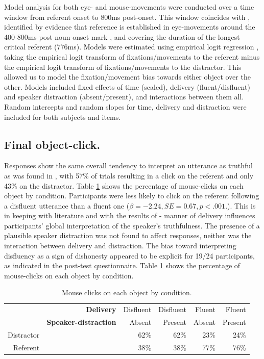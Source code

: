 \documentclass[a4paper,man,natbib]{apa6}
\begin{document}
Model analysis for both eye- and mouse-movements were conducted over a time window from referent onset to 800ms post-onset. 
This window coincides with \citet{Loy2016}, identified by evidence that reference is established in eye-movements around the 400-800ms post noun-onset mark \citep{Eberhard1995}, and covering the duration of the longest critical referent (776ms). 
Models were estimated using empirical logit regression \citep{Barr2008}, taking the empirical logit transform of fixations/movements to the referent minus the empirical logit transform of fixations/movements to the distractor.
This allowed us to model the fixation/movement bias towards either object over the other. 
Models included fixed effects of time (scaled), delivery (fluent/disfluent) and speaker distraction (absent/present), and interactions between them all. 
Random intercepts and random slopes for time, delivery and distraction were included for both subjects and items.


\subsection{Final object-click.}
Responses show the same overall tendency to interpret an utterance as truthful as was found in \citet{Loy2016}, with 57\% of trials resulting in a click on the referent and only 43\% on the distractor. 
Table \ref{table:objctclck} shows the percentage of mouse-clicks on each object by condition.
Participants were less likely to click on the referent following a disfluent utterance than a fluent one ($\beta = -2.24,SE = 0.67,p<.001.$). 
This is in keeping with literature \citep{Brennan1995, Swerts2005} and with the results of \citet{Loy2016} - manner of delivery influences participants' global interpretation of the speaker's truthfulness. 
The presence of a plausible speaker distraction was not found to affect responses, neither was the interaction between delivery and distraction. 
The bias toward interpreting disfluency as a sign of dishonesty appeared to be explicit for 19/24 participants, as indicated in the post-test questionnaire. 
Table \ref{table:objctclck} shows the percentage of mouse-clicks on each object by condition.


\begin{table}[ht]
\centering
\begin{tabular}{rrrrrr}
  \hline
& \textbf{Delivery} & Disfluent & Disfluent & Fluent & Fluent \\ 
& \textbf{Speaker-distraction} & Absent & Present & Absent & Present \\
  \hline
Distractor & &  62\% &  62\% &  23\% &  24\% \\ 
  Referent & &  38\% &  38\% &  77\% &  76\% \\ 
   \hline
\end{tabular}
\caption{Mouse clicks on each object by condition.}
\label{table:objctclck}
\end{table}
\end{document}
